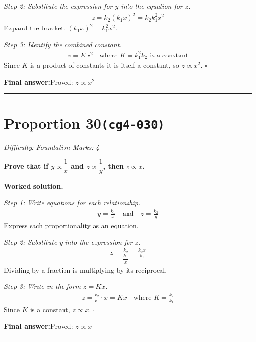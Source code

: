 \documentclass[11pt]{article}
\newcommand{\question}[1]{\par\medskip\noindent\textbf{#1}\par}
\begin{document}
\textit{Step 2: Substitute the expression for \( y \) into the equation for \( z \).}
\[\begin{gathered}
z = k_2 (k_1 x)^2 = k_2 k_1^2 x^2
\end{gathered}\]
Expand the bracket: \( (k_1 x)^2 = k_1^2 x^2 \).

\textit{Step 3: Identify the combined constant.}
\[\begin{gathered}
z = K x^2 \quad \text{where } K = k_1^2 k_2 \text{ is a constant}
\end{gathered}\]
Since \( K \) is a product of constants it is itself a constant, so \( z \propto x^2 \). \( \square \)

\begin{answerbox}
\textbf{Final answer:}\quad Proved: \(\displaystyle  z \propto x^2 \)
\end{answerbox}
\medskip\hrule

\section*{Proportion 30\quad\small\texttt{(cg4-030)}}
\textit{Difficulty: Foundation \quad\textbar\quad Marks: 4}

\question{Prove that if \( y \propto \dfrac{1}{x} \) and \( z \propto \dfrac{1}{y} \), then \( z \propto x \).}

\textbf{Worked solution.}

\textit{Step 1: Write equations for each relationship.}
\[\begin{gathered}
y = \frac{k_1}{x} \quad \text{and} \quad z = \frac{k_2}{y}
\end{gathered}\]
Express each proportionality as an equation.

\textit{Step 2: Substitute \( y \) into the expression for \( z \).}
\[\begin{gathered}
z = \frac{k_2}{\dfrac{k_1}{x}} = \frac{k_2 x}{k_1}
\end{gathered}\]
Dividing by a fraction is multiplying by its reciprocal.

\textit{Step 3: Write in the form \( z = Kx \).}
\[\begin{gathered}
z = \frac{k_2}{k_1} \cdot x = Kx \quad \text{where } K = \frac{k_2}{k_1}
\end{gathered}\]
Since \( K \) is a constant, \( z \propto x \). \( \square \)

\begin{answerbox}
\textbf{Final answer:}\quad Proved: \(\displaystyle  z \propto x \)
\end{answerbox}
\medskip\hrule
\end{document}
